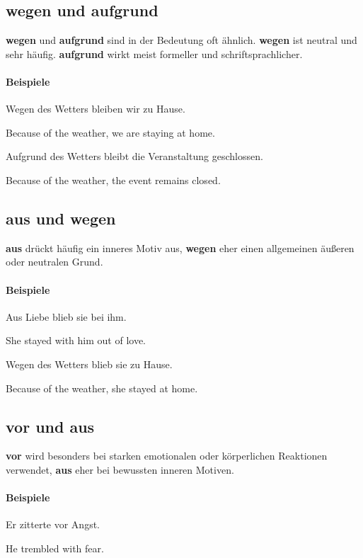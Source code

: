 \documentclass[a4paper]{article}
\newcommand{\EN}[1]{\par{\small\textcolor{TranslationGray}{#1}}\vspace{0.25em}}
\begin{document}
    \subsection{wegen und aufgrund}
        \textbf{wegen} und \textbf{aufgrund} sind in der Bedeutung oft ähnlich. \textbf{wegen} ist neutral und sehr häufig. \textbf{aufgrund} wirkt meist formeller und schriftsprachlicher.
        
        \paragraph{Beispiele}
            Wegen des Wetters bleiben wir zu Hause.\\
            \EN{Because of the weather, we are staying at home.}
            
            Aufgrund des Wetters bleibt die Veranstaltung geschlossen.\\
            \EN{Because of the weather, the event remains closed.}
    
    \subsection{aus und wegen}
    \textbf{aus} drückt häufig ein inneres Motiv aus, \textbf{wegen} eher einen allgemeinen äußeren oder neutralen Grund.
    
    \paragraph{Beispiele}
        Aus Liebe blieb sie bei ihm.\\
        \EN{She stayed with him out of love.}
        
        Wegen des Wetters blieb sie zu Hause.\\
        \EN{Because of the weather, she stayed at home.}
    
    \subsection{vor und aus}
    \textbf{vor} wird besonders bei starken emotionalen oder körperlichen Reaktionen verwendet, \textbf{aus} eher bei bewussten inneren Motiven.
    
    \paragraph{Beispiele}
        Er zitterte vor Angst.\\
        \EN{He trembled with fear.}
        
\end{document}
